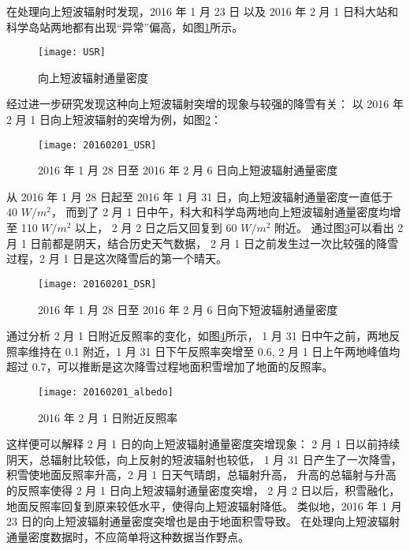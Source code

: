 在处理向上短波辐射时发现，2016 年 1 月 23 日
以及 2016 年 2 月 1 日科大站和科学岛站两地都有出现“异常”偏高，如图\ref{fig:USR}所示。
\begin{figure}[H]
\centering
\texttt{[image: USR]}
\caption{向上短波辐射通量密度}\label{fig:USR}
\end{figure}
经过进一步研究发现这种向上短波辐射突增的现象与较强的降雪有关：
以 2016 年 2 月 1 日向上短波辐射的突增为例，如图\ref{fig:20160201_USR}：
\begin{figure}[H]
\centering
\texttt{[image: 20160201\_USR]}
\caption{2016 年 1 月 28 日至 2016 年 2 月 6 日向上短波辐射通量密度}\label{fig:20160201_USR}
\end{figure}
从 2016 年 1 月 28 日起至 2016 年 1 月 31 日，向上短波辐射通量密度一直低于 40 $W/m^{2}$，
而到了 2 月 1 日中午，科大和科学岛两地向上短波辐射通量密度均增至 110 $W/m^{2}$ 以上，
2 月 2 日之后又回复到 60 $W/m^{2}$ 附近。
通过图\ref{fig:20160201_DSR}可以看出 2 月 1 日前都是阴天，结合历史天气数据，
2 月 1 日之前发生过一次比较强的降雪过程，2 月 1 日是这次降雪后的第一个晴天。
\begin{figure}[H]
\centering
\texttt{[image: 20160201\_DSR]}
\caption{2016 年 1 月 28 日至 2016 年 2 月 6 日向下短波辐射通量密度}\label{fig:20160201_DSR}
\end{figure}
通过分析 2 月 1 日附近反照率的变化，如图\ref{fig:20160201_albedo}所示，
1 月 31 日中午之前，两地反照率维持在 0.1 附近，1 月 31 日下午反照率突增至 0.6,
2 月 1 日上午两地峰值均超过 0.7，可以推断是这次降雪过程地面积雪增加了地面的反照率。
\begin{figure}[H]
\centering
\texttt{[image: 20160201\_albedo]}
\caption{2016 年 2 月 1 日附近反照率}\label{fig:20160201_albedo}
\end{figure}
这样便可以解释 2 月 1 日的向上短波辐射通量密度突增现象：
2 月 1 日以前持续阴天，总辐射比较低，向上反射的短波辐射也较低，
1 月 31 日产生了一次降雪，积雪使地面反照率升高，2 月 1 日天气晴朗，总辐射升高，
升高的总辐射与升高的反照率使得 2 月 1 日向上短波辐射通量密度突增，
2 月 2 日以后，积雪融化，地面反照率回复到原来较低水平，使得向上短波辐射降低。
类似地，2016 年 1 月 23 日的向上短波辐射通量密度突增也是由于地面积雪导致。
在处理向上短波辐射通量密度数据时，不应简单将这种数据当作野点。
